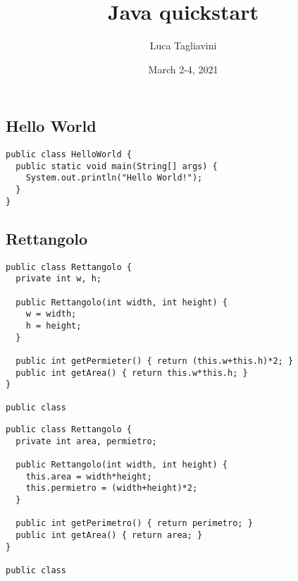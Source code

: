 \documentclass{article}
\title{\textbf{Java quickstart}}
\author{Luca Tagliavini}
\date{March 2-4, 2021}
\begin{document}
\maketitle
\tableofcontents
\pagebreak

\subsection{Hello World}

\begin{lstlisting}
public class HelloWorld {
  public static void main(String[] args) {
    System.out.println("Hello World!");
  }
}
\end{lstlisting}

\subsection{Rettangolo}

\begin{lstlisting}
public class Rettangolo {
  private int w, h;

  public Rettangolo(int width, int height) {
    w = width;
    h = height;
  }

  public int getPermieter() { return (this.w+this.h)*2; }
  public int getArea() { return this.w*this.h; }
}

public class
\end{lstlisting}

\begin{lstlisting}
public class Rettangolo {
  private int area, permietro;

  public Rettangolo(int width, int height) {
    this.area = width*height;
    this.permietro = (width+height)*2;
  }

  public int getPerimetro() { return perimetro; }
  public int getArea() { return area; }
}

public class
\end{lstlisting}
\end{document}
